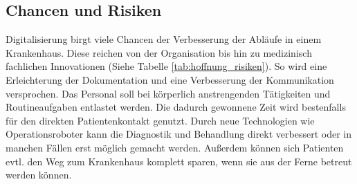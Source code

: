 \subsection{Chancen und Risiken}
Digitalisierung birgt viele Chancen der Verbesserung der Abläufe in einem Krankenhaus. Diese reichen von der Organisation bis hin zu medizinisch fachlichen Innovationen (Siehe Tabelle \ref{tab:hoffnung_risiken}). So wird eine Erleichterung der Dokumentation und eine Verbesserung der Kommunikation versprochen. Das Personal soll bei körperlich anstrengenden Tätigkeiten und Routineaufgaben entlastet werden. Die dadurch gewonnene Zeit wird bestenfalls für den direkten Patientenkontakt genutzt. Durch neue Technologien wie Operationsroboter kann die Diagnostik und Behandlung direkt verbessert oder in manchen Fällen erst möglich gemacht werden. Außerdem können sich Patienten evtl. den Weg zum Krankenhaus komplett sparen, wenn sie aus der Ferne betreut werden können. \parencite{braeutigam2017}

